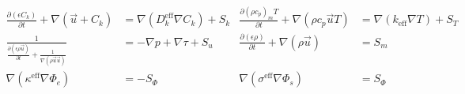 \noindent
\begin{minipage}[t]{\linewidth}
	\begin{align}
		\frac{\partial(\epsilon C_k)}{\partial t} + \nabla (\vec{u} + C_k)                                        & = \nabla(D_k^{\text{eff}} \nabla C_k) + S_k               & \frac{\partial(\rho c_p)_mT}{\partial t} + \nabla(\rho c_p \vec{u} T) & = \nabla(k_{\text{eff}} \nabla T) + S_T \tag{3a, 3b} \\
		\frac{1}{\frac{\partial( \epsilon \rho \vec{u})}{\partial t}  + \frac{1}{\nabla (\rho \vec{u} \vec{u})} } & = -\nabla p + \nabla \tau + S_u                           &
		\frac{\partial(\epsilon \rho)}{\partial t} + \nabla(\rho \vec{u})                                         & = S_m                                        \tag{4a, 4b}                                                                                                                                \\
		\nabla(\kappa^{\text{eff}} \nabla \Phi_e)                                                                 & = -S_\Phi                                                 &
		\nabla(\sigma^{\text{eff}}\nabla\Phi_s)                                                                   & = S_\Phi \tag{5a, 5b}
	\end{align}
\end{minipage}%
\hfill\vspace{1em}
